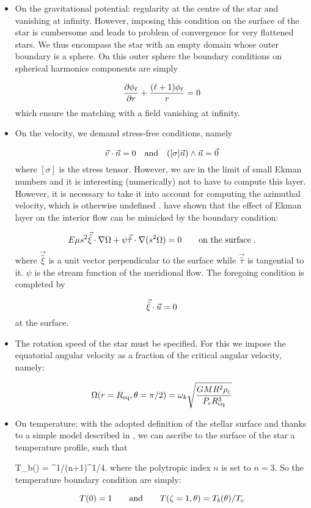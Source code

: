 \begin{itemize}
\item On the gravitational potential: regularity at the centre of the
star and vanishing at infinity. However, imposing this condition on the
surface of the star is cumbersome and leads to problem of convergence
for very flattened stars. We thus encompass the star with an empty
domain whose outer boundary is a sphere. On this outer sphere the
boundary conditions on spherical harmonics components are simply

\[ 
\frac{\partial \phi_\ell}{\partial r}+\frac{(\ell+1)\phi_\ell}{r}=0
\]
which ensure the matching with a field vanishing at infinity.

\item On the velocity, we demand stress-free conditions, namely

\[ \vec{v}\cdot \vec{n} =0 \quad {\rm and}\quad ([\sigma]\vec{n})\wedge\vec{n} =\vec{0}
\]
where $[\sigma]$ is the stress tensor. However, we are in the limit of
small Ekman numbers and it is interesting (numerically) not to have to
compute this layer. However, it is necessary to take it into account
for computing the azimuthal velocity, which is otherwise undefined
\cite[e.g.][]{ELR13}. \cite{ELR13} have shown that the effect of
Ekman layer on the interior flow can be mimicked by the boundary
condition:

\begin{equation}
\label{eq:bl}
E\mu
s^2\vec{\hat\xi}\cdot\nabla\Omega+\psi\vec{\hat\tau}\cdot\nabla(s^2\Omega)=0
\qquad\mbox{on the surface}\;.
\end{equation}
where $\vec{\hat\xi}$ is a unit vector perpendicular to the surface
while $\vec{\hat\tau}$ is tangential to it. $\psi$ is the stream
function of the meridional flow. The foregoing condition is completed by

\[ \vec{\hat\xi}\cdot\vec{u} = 0\]
at the surface.

\item The rotation speed of the star must be specified. For this we
impose the equatorial angular velocity as a fraction of the critical
angular velocity, namely:

\[ \Omega(r=R_{\rm eq},\theta=\pi/2) =
\omega_k\sqrt{\frac{GMR^2\rho_c}{P_cR_{\rm eq}^3}}\]

\item On temperature: with the adopted definition of the stellar surface
and thanks to a simple model described in \cite{ELR13}, we can ascribe
to the surface of the star a temperature profile, such that

\beq T_b(\theta) = \lp{}\rp^{1/(n+1)}\lp{}\rp^{1/4}\;.
where the polytropic index $n$ is set to $n=3$. So the temperature
boundary condition are simply:

\[ T(0) = 1 \andet T(\zeta=1,\theta)=T_b(\theta)/T_c\]


\end{itemize}



